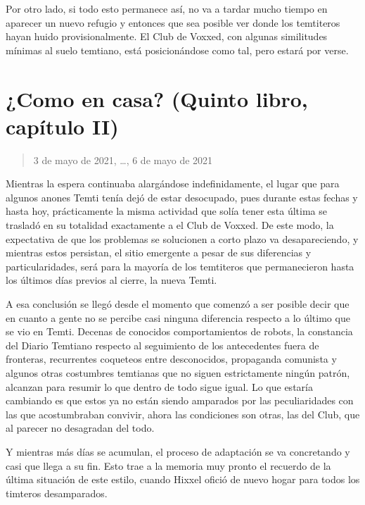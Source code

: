 \documentclass[
]{book}
\begin{document}
Por otro lado, si todo esto permanece así, no va a tardar mucho tiempo en aparecer un nuevo refugio y entonces que sea posible ver donde los temtiteros hayan huido provisionalmente. El Club de Voxxed, con algunas similitudes mínimas al suelo temtiano, está posicionándose como tal, pero estará por verse.

\hypertarget{como-en-casa-quinto-libro-capuxedtulo-ii}{%
\section{¿Como en casa? (Quinto libro, capítulo II)}\label{como-en-casa-quinto-libro-capuxedtulo-ii}}

\begin{quote}
3 de mayo de 2021, \ldots, 6 de mayo de 2021
\end{quote}

Mientras la espera continuaba alargándose indefinidamente, el lugar que para algunos anones Temti tenía dejó de estar desocupado, pues durante estas fechas y hasta hoy, prácticamente la misma actividad que solía tener esta última se trasladó en su totalidad exactamente a el Club de Voxxed. De este modo, la expectativa de que los problemas se solucionen a corto plazo va desapareciendo, y mientras estos persistan, el sitio emergente a pesar de sus diferencias y particularidades, será para la mayoría de los temtiteros que permanecieron hasta los últimos días previos al cierre, la nueva Temti.

A esa conclusión se llegó desde el momento que comenzó a ser posible decir que en cuanto a gente no se percibe casi ninguna diferencia respecto a lo último que se vio en Temti. Decenas de conocidos comportamientos de robots, la constancia del Diario Temtiano respecto al seguimiento de los antecedentes fuera de fronteras, recurrentes coqueteos entre desconocidos, propaganda comunista y algunos otras costumbres temtianas que no siguen estrictamente ningún patrón, alcanzan para resumir lo que dentro de todo sigue igual. Lo que estaría cambiando es que estos ya no están siendo amparados por las peculiaridades con las que acostumbraban convivir, ahora las condiciones son otras, las del Club, que al parecer no desagradan del todo.

Y mientras más días se acumulan, el proceso de adaptación se va concretando y casi que llega a su fin. Esto trae a la memoria muy pronto el recuerdo de la última situación de este estilo, cuando Hixxel ofició de nuevo hogar para todos los timteros desamparados.
\end{document}
